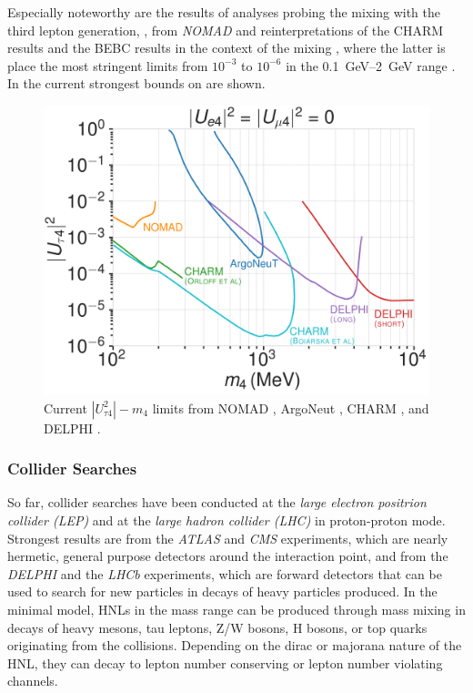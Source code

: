 Especially noteworthy are the results of analyses probing the mixing with the third lepton generation, , from \textit{NOMAD}  and reinterpretations of the CHARM results and the BEBC results in the context of the mixing , where the latter is place the most stringent limits from $10^{-3}$ to $10^{-6}$ in the \SIrange{0.1}{2}{\giga\electronvolt} range . In  the current strongest bounds on  are shown.

\begin{figure}
  \includegraphics{figures/hnl_simulation/theory/UtauN_custom_plots_LF_grid_white.png}
  \caption[Current $|U_{\tau4}^2|-m_4$ limits]{Current $|U_{\tau4}^2|-m_4$ limits from NOMAD \cite{NOMAD:2001eyx}, ArgoNeut \cite{ArgoNeuT:2021clc}, CHARM \cite{Orloff:2002de, Boiarska:2021yho}, and DELPHI \cite{DELPHI:1996qcc}.}
\end{figure}

\subsubsection{Collider Searches}

So far, collider searches have been conducted at the \textit{large electron positrion collider (LEP)} and at the \textit{large hadron collider (LHC)} in proton-proton
mode.
Strongest results are from the \textit{ATLAS} and \textit{CMS} experiments, which are nearly hermetic, general purpose detectors around the interaction point, and from the \textit{DELPHI} and the \textit{LHCb} experiments, which are forward detectors that can be used to search for new particles in decays of heavy particles produced. In the minimal model, HNLs in the \si{\gev} mass range can be produced through mass mixing in decays of heavy mesons, tau leptons, Z/W bosons, H bosons, or top quarks originating from the collisions. Depending on the dirac or majorana nature of the HNL, they can decay to lepton number conserving or lepton number violating channels.

